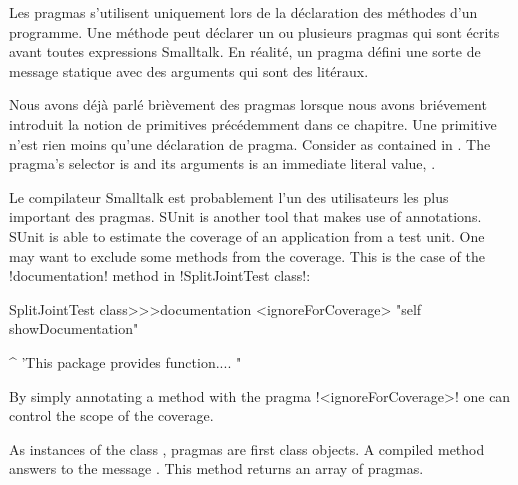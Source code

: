 \documentclass[a4paper,10pt,twoside]{book}
\begin{document}
Les pragmas s'utilisent uniquement lors de la déclaration des méthodes d'un programme. Une méthode peut déclarer un ou plusieurs pragmas qui sont écrits avant toutes expressions Smalltalk. En réalité, un pragma défini une sorte de message statique avec des arguments qui sont des litéraux.

Nous avons déjà parlé brièvement des pragmas lorsque nous avons briévement introduit la notion de primitives précédemment dans ce chapitre. Une primitive n'est rien moins qu'une déclaration de pragma. 
Consider  as contained in . The pragma's selector is  and its arguments is an immediate literal value, . 

Le compilateur Smalltalk est probablement l'un des utilisateurs les plus important des pragmas. SUnit is another tool that makes use of annotations. SUnit is able to estimate the coverage of an application from a test unit. One may want to exclude some methods from the coverage. This is the case of the \ct!documentation! method in \ct!SplitJointTest class!:

\begin{code}{}
SplitJointTest class>>>documentation
	<ignoreForCoverage>
	"self showDocumentation"
	
	^ 'This package provides function.... "
\end{code}

By simply annotating a method with the pragma \ct!<ignoreForCoverage>! one can control the scope of the coverage.


%	


As instances of the class , pragmas are first class objects. A compiled method answers to the message . This method returns an array of pragmas. 
\end{document}
